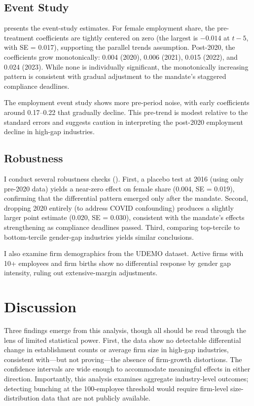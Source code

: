 \documentclass[12pt]{article}
\begin{document}


\subsection{Event Study}

 presents the event-study estimates. For female employment share, the pre-treatment coefficients are tightly centered on zero (the largest is $-0.014$ at $t-5$, with SE = 0.017), supporting the parallel trends assumption. Post-2020, the coefficients grow monotonically: 0.004 (2020), 0.006 (2021), 0.015 (2022), and 0.024 (2023). While none is individually significant, the monotonically increasing pattern is consistent with gradual adjustment to the mandate's staggered compliance deadlines.

The employment event study shows more pre-period noise, with early coefficients around 0.17--0.22 that gradually decline. This pre-trend is modest relative to the standard errors and suggests caution in interpreting the post-2020 employment decline in high-gap industries.



\subsection{Robustness}

I conduct several robustness checks (). First, a placebo test at 2016 (using only pre-2020 data) yields a near-zero effect on female share (0.004, SE = 0.019), confirming that the differential pattern emerged only after the mandate. Second, dropping 2020 entirely (to address COVID confounding) produces a slightly larger point estimate (0.020, SE = 0.030), consistent with the mandate's effects strengthening as compliance deadlines passed. Third, comparing top-tercile to bottom-tercile gender-gap industries yields similar conclusions.

I also examine firm demographics from the UDEMO dataset. Active firms with 10+ employees and firm births show no differential response by gender gap intensity, ruling out extensive-margin adjustments.




\section{Discussion}

Three findings emerge from this analysis, though all should be read through the lens of limited statistical power. First, the data show no detectable differential change in establishment counts or average firm size in high-gap industries, consistent with---but not proving---the absence of firm-growth distortions. The confidence intervals are wide enough to accommodate meaningful effects in either direction. Importantly, this analysis examines aggregate industry-level outcomes; detecting bunching at the 100-employee threshold would require firm-level size-distribution data that are not publicly available.
\end{document}
